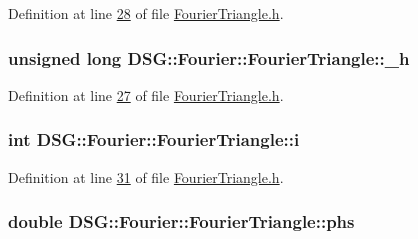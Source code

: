 Definition at line \hyperlink{_fourier_triangle_8h_source_l00028}{28} of file \hyperlink{_fourier_triangle_8h_source}{Fourier\+Triangle.\+h}.

\hypertarget{class_d_s_g_1_1_fourier_1_1_fourier_triangle_a6fe21fae0d58d6221602e4bd74c30a80}{
\subsubsection[{\+\_\+h}]{\setlength{\rightskip}{0pt plus 5cm}unsigned long D\+S\+G\+::\+Fourier\+::\+Fourier\+Triangle\+::\+\_\+h\hspace{0.3cm}{\ttfamily [protected]}}}\label{class_d_s_g_1_1_fourier_1_1_fourier_triangle_a6fe21fae0d58d6221602e4bd74c30a80}


Definition at line \hyperlink{_fourier_triangle_8h_source_l00027}{27} of file \hyperlink{_fourier_triangle_8h_source}{Fourier\+Triangle.\+h}.

\hypertarget{class_d_s_g_1_1_fourier_1_1_fourier_triangle_a041154af261bce33f4764f60b6606ea4}{
\subsubsection[{i}]{\setlength{\rightskip}{0pt plus 5cm}int D\+S\+G\+::\+Fourier\+::\+Fourier\+Triangle\+::i\hspace{0.3cm}{\ttfamily [protected]}}}\label{class_d_s_g_1_1_fourier_1_1_fourier_triangle_a041154af261bce33f4764f60b6606ea4}


Definition at line \hyperlink{_fourier_triangle_8h_source_l00031}{31} of file \hyperlink{_fourier_triangle_8h_source}{Fourier\+Triangle.\+h}.

\hypertarget{class_d_s_g_1_1_fourier_1_1_fourier_triangle_a274fb09e2f14f88ec969dcaa7ad423f4}{
\subsubsection[{phs}]{\setlength{\rightskip}{0pt plus 5cm}double D\+S\+G\+::\+Fourier\+::\+Fourier\+Triangle\+::phs\hspace{0.3cm}{\ttfamily [protected]}}}\label{class_d_s_g_1_1_fourier_1_1_fourier_triangle_a274fb09e2f14f88ec969dcaa7ad423f4}


